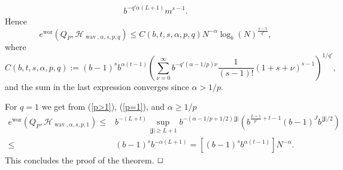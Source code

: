 \documentclass[12pt]{article}
\DeclareMathOperator{\wav}{wav}
\DeclareMathOperator{\wor}{wor}
\newenvironment{proof}{\begin{trivlist}
    \item[\hskip\labelsep{\it Proof.}]}{$\hfill\Box$\end{trivlist}}
\newcommand{\bsj}{\boldsymbol{j}}
\newcommand{\HH}{\mathcal{H}}
\begin{document}
\begin{proof}
\begin{equation*}
\begin{split}
 b^{-q'\alpha(L+1)} m^{s-1}.
 \end{split}
\end{equation*}
Hence
\begin{equation*}
e^{\wor}(Q_{P}, \HH_{\wav,\alpha,s,p,q}) \le  C(b,t,s,\alpha,p,q) N^{-\alpha} \log_b(N)^{\frac{s-1}{q'}},
\end{equation*}
where
\begin{equation*}
C(b,t,s,\alpha,p,q) :=  (b-1)^{s}b^{\alpha(t-1)} \left( \sum^\infty_{\nu=0} b^{-q'(\alpha-1/p)\nu}
\frac{1}{(s-1)!} \left( 1 + s+\nu \right)^{s-1} \right)^{1/q'},
\end{equation*}
and the sum in the last expression converges since $\alpha > 1/p$. 

For $q=1$ we get from (\ref{p>1}), (\ref{p=1}), and $\alpha \ge 1/p$ 
\begin{equation*}
\begin{split}
e^{\wor}(Q_{P}, \HH_{\wav,\alpha,s,p,1}) \le&
b^{-(L+t)} \sup_{|\bsj| \ge L+1} b^{-(\alpha -1/p +1/2)|\bsj|} \left( b^{\frac{L+1}{p'} +t -1} (b-1)^{J} b^{|\bsj|/2} \right)\\
\le& (b-1)^{s} b^{-\alpha(L+1)} = \left[ (b-1)^{s} b^{\alpha(t-1)} \right] N^{-\alpha}.
\end{split}
\end{equation*}
This concludes the proof of the theorem.
\end{proof}
\end{document}
